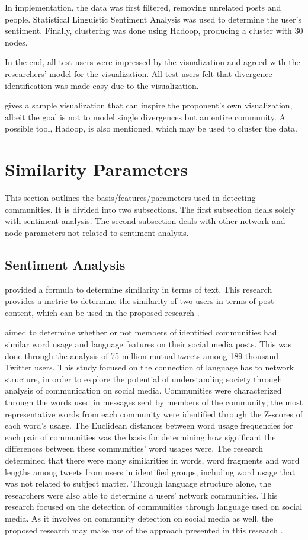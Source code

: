 In implementation, the data was first filtered, removing unrelated posts and people. Statistical Linguistic Sentiment Analysis was used to determine the user’s sentiment. Finally, clustering was done using Hadoop, producing a cluster with 30 nodes. 

In the end, all test users were impressed by the visualization and agreed with the researchers’ model for the visualization. All test users felt that divergence identification was made easy due to the visualization. 

 gives a sample visualization that can inspire the proponent’s own visualization, albeit the goal is not to model single divergences but an entire community. A possible tool, Hadoop, is also mentioned, which may be used to cluster the data.

\section{Similarity Parameters}
This section outlines the basis/features/parameters used in detecting communities. It is divided into two subsections. The first subsection deals solely with sentiment analysis. The second subsection deals with other network and node parameters not related to sentiment analysis. 

\subsection{Sentiment Analysis}

 provided a formula to determine similarity in terms of text. This research provides a metric to determine the similarity of two users in terms of post content, which can be used in the proposed research \cite{Zhang:2012}.

 aimed to determine whether or not members of identified communities had similar word usage and language features on their social media posts. This was done through the analysis of 75 million mutual tweets among 189 thousand Twitter users. This study focused on the connection of language has to network structure, in order to explore the potential of understanding society through analysis of communication on social media. Communities were characterized through the words used in messages sent by members of the community; the most representative words from each community were identified through the Z-scores of each word’s usage. The Euclidean distances between word usage frequencies for each pair of communities was the basis for determining how significant the differences between these communities’ word usages were. The research determined that there were many similarities in words, word fragments and word lengths among tweets from users in identified groups, including word usage that was not related to subject matter. Through language structure alone, the researchers were also able to determine a users' network communities. This research focused on the detection of communities through language used on social media. As it involves on community detection on social media as well, the proposed research may make use of the approach presented in this research \cite{Bryden:2013}.

